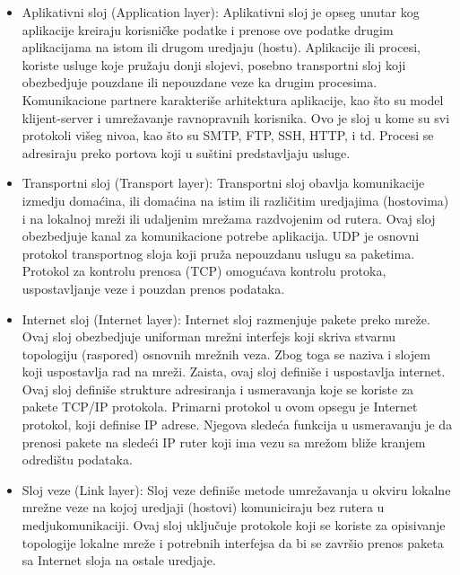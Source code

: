 \documentclass[a4paper,12pt, master]{etf}
\begin{document}
	\begin{itemize}
		\item Aplikativni sloj (Application layer):
		Aplikativni sloj je opseg unutar kog aplikacije kreiraju korisni\v{c}ke podatke i prenose
		ove podatke drugim aplikacijama na istom ili drugom uredjaju (hostu). Aplikacije ili
		procesi, koriste usluge koje pru\v{z}aju donji slojevi, posebno transportni sloj koji
		obezbedjuje pouzdane ili nepouzdane veze ka drugim procesima. Komunikacione partnere
		karakteri\v{s}e arhitektura aplikacije, kao \v{s}to su model klijent-server i umre\v{z}avanje
		ravnopravnih korisnika. Ovo je sloj u kome su svi protokoli vi\v{s}eg nivoa, kao \v{s}to su SMTP,
		 FTP, SSH, HTTP, i td. Procesi se adresiraju preko portova koji u su\v{s}tini predstavljaju
		 usluge.
		\item Transportni sloj (Transport layer):
		Transportni sloj obavlja komunikacije izmedju doma\'{c}ina, ili doma\'{c}ina na istim ili
		razli\v{c}itim uredjajima (hostovima) i na lokalnoj mre\v{z}i ili udaljenim mre\v{z}ama razdvojenim
		od rutera. Ovaj sloj obezbedjuje kanal za komunikacione potrebe aplikacija. UDP je
		osnovni protokol transportnog sloja koji pru\v{z}a nepouzdanu uslugu sa paketima. Protokol
		za kontrolu prenosa (TCP) omogu\'{c}ava kontrolu protoka, uspostavljanje veze i pouzdan
		prenos podataka.
		\item Internet sloj (Internet layer):
		Internet sloj razmenjuje pakete preko mre\v{z}e. Ovaj sloj obezbedjuje uniforman mre\v{z}ni
		interfejs koji skriva stvarnu topologiju (raspored) osnovnih mre\v{z}nih veza. Zbog toga se
		naziva i slojem koji uspostavlja rad na mre\v{z}i. Zaista, ovaj sloj defini\v{s}e i uspostavlja
		internet. Ovaj sloj defini\v{s}e strukture adresiranja i usmeravanja koje se koriste za
		pakete TCP/IP protokola. Primarni protokol u ovom opsegu je Internet protokol, koji
		definise IP adrese. Njegova slede\'{c}a funkcija u usmeravanju je da prenosi pakete
		na slede\'{c}i IP ruter koji ima vezu sa mre\v{z}om bli\v{z}e kranjem odredi\v{s}tu podataka.
		\item Sloj veze (Link layer):
		Sloj veze defini\v{s}e metode umre\v{z}avanja u okviru lokalne mre\v{z}ne veze na kojoj uredjaji
		(hostovi) komuniciraju bez rutera u medjukomunikaciji. Ovaj sloj uklju\v{c}uje protokole
		koji se koriste za opisivanje topologije lokalne mre\v{z}e i potrebnih interfejsa da bi se
		zavr\v{s}io prenos paketa sa Internet sloja na ostale uredjaje.
	\end{itemize}
\end{document}
